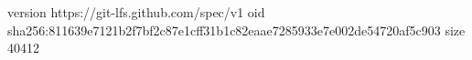 version https://git-lfs.github.com/spec/v1
oid sha256:811639e7121b2f7bf2c87e1cff31b1c82eaae7285933e7e002de54720af5c903
size 40412
